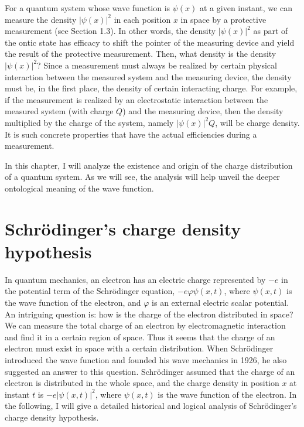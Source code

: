 For a quantum system whose wave function is $\psi(x)$ at a given instant, we can measure the density $|\psi(x)|^2$ in each position $x$ in space by a protective measurement (see Section 1.3). In other words, the density $|\psi(x)|^2$ as part of the ontic state has efficacy to shift the pointer of the measuring device and yield the  result of the protective measurement. Then, what density is the density $|\psi(x)|^2$?
Since a measurement must always be realized by certain physical interaction between the measured system and the measuring device, the density must be, in the first place, the density of certain interacting charge. For example, if the measurement is realized by an electrostatic interaction between the measured system (with charge $Q$) and the measuring device, then the density multiplied by the charge of the system, namely $|\psi(x)|^2Q$, will be charge density. It is such concrete properties that have the actual efficiencies during a measurement.

In this chapter, I will analyze the existence and origin of the charge distribution of a quantum system. As we will see, the analysis will help unveil the deeper ontological meaning of the wave function.

\section{Schr\"{o}dinger's charge density hypothesis}

In quantum mechanics, an electron has an electric charge represented by $-e$ in the potential term of the Schr\"{o}dinger equation, $-e\varphi \psi(x,t)$, where $\psi(x,t)$ is the wave function of the electron, and $\varphi$ is an external electric scalar potential. An intriguing question is: how is the charge of the electron distributed in space?
We can measure the total charge of an electron by electromagnetic interaction and find it in a certain region of space. Thus it seems that the charge of an electron must exist in space with a certain distribution. When Schr\"{o}dinger introduced the wave function and founded his wave mechanics in 1926, he also suggested an answer to this question. Schr\"{o}dinger assumed that the charge of an electron is distributed in the whole space, and the charge density in position $x$ at instant $t$ is $-e|\psi(x,t)|^2$, where $\psi(x,t)$ is the wave function of the electron. In the following, I will give a detailed historical and logical analysis of Schr\"{o}dinger's charge density hypothesis.

